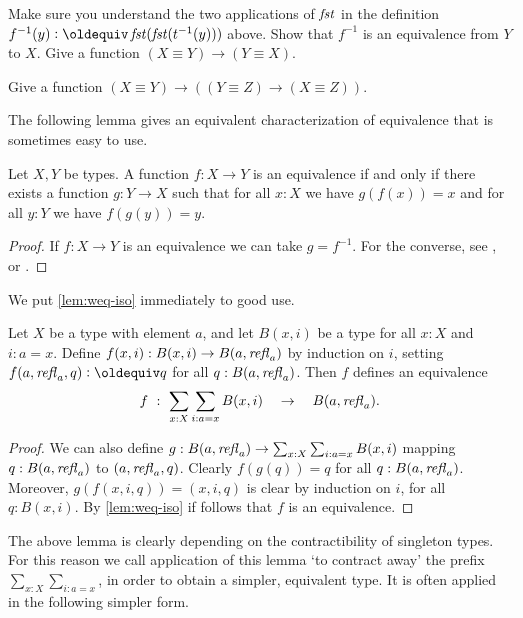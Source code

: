\begin{xca}\label{xca:equivalence-invers}
Make sure you understand the two applications of $\mathop{\mathit{fst}}$
in the definition $f^{-1}(y)\defeq\fst(\fst(t^{-1}(y)))$ above.
Show that $f^{-1}$ is an equivalence from $Y$ to $X$.
Give a function $(X\equiv Y) \to (Y\equiv X)$.
\end{xca}

\begin{xca}\label{xca:equivalence-comp}
Give  a function $(X\equiv Y) \to ((Y\equiv Z) \to (X\equiv Z))$.
\end{xca}

The following lemma gives an equivalent characterization
of equivalence that is sometimes easy to use.

\begin{lemma}\label{lem:weq-iso}
Let $X,Y$ be types. A function $f: X\to Y$ is an equivalence
if and only if there exists a function $g: Y\to X$ such that
for all $x:X$ we have $g(f(x))=x$ and for all 
$y:Y$ we have $f(g(y))=y$.
\end{lemma}
\begin{proof}
If $f: X\to Y$ is an equivalence we can take $g=f^{-1}$.
For the converse, see
\cite[Chapter 4]{hottbook}, or .
\end{proof}

We put \cref{lem:weq-iso} immediately to good use.

\begin{lemma}\label{lem:contract-away}
Let $X$ be a type with element $a$, and let
$B(x,i)$ be a type for all $x:X$ and $i: a=x$.
Define $f(x,i): B(x,i) \to B(a,\mathop{{\it refl}_{a}})$ by induction on $i$,
setting $f(a,\refl{a},q) \defeq q$ for all $q:B(a,\mathop{{\it refl}_{a}})$.
Then $f$ defines an equivalence 
\[
f~:~ \sum_{x:X} \sum_{i: a=x} B(x,i) \quad \to \quad B(a,\mathop{{\it refl}_{a}}).
\]
\end{lemma}
\begin{proof}
We can also define 
$g: B(a,\mathop{{\it refl}_{a}})\to \sum_{x:X} \sum_{i: a=x} B(x,i)$
mapping $q: B(a,\mathop{{\it refl}_{a}})$ to $(a,\mathop{{\it refl}_{a}},q)$.
Clearly $f(g(q))=q$ for all $q:B(a,\mathop{{\it refl}_{a}})$.
Moreover, $g(f(x,i,q))=(x,i,q)$ is clear by induction
on $i$, for all $q:B(x,i)$.
By \cref{lem:weq-iso} if follows that $f$
is an equivalence.
\end{proof}

The above lemma is clearly depending on the 
contractibility of singleton types. For this reason
we call application of this lemma `to contract away'
the prefix $\sum_{x:X} \sum_{i: a=x}$, in order
to obtain a simpler, equivalent type. It is often applied
in the following simpler form.


